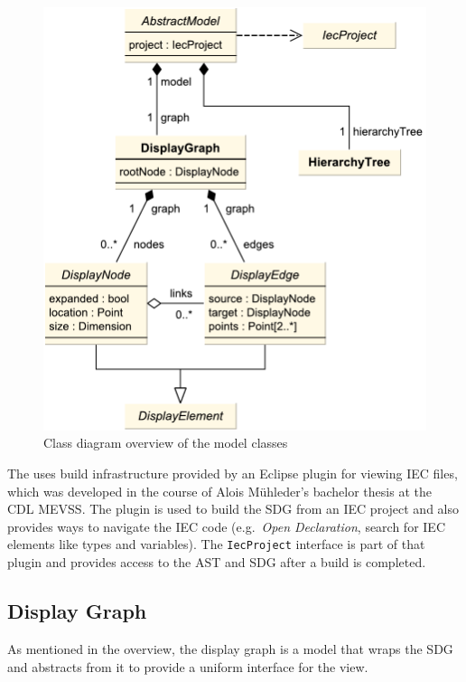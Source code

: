 \begin{figure}[htb]
  \centering
    \includegraphics[scale=0.65]{bilder/classes-model}
  \caption{Class diagram overview of the model classes}
  \label{fig:classes-model}
\end{figure}

The \SB uses build infrastructure provided by an Eclipse plugin for viewing IEC files, which was developed in the 
course of Alois Mühleder's bachelor thesis \cite{MuehlederBA} at the CDL MEVSS. The plugin is used to build the SDG 
from an IEC project and also provides ways to navigate the IEC code (e.g.\ \emph{Open Declaration}, search for IEC 
elements like types and variables). The \lstinline|IecProject| interface is part of that plugin and provides access to 
the AST and SDG after a build is completed.

\subsection{Display Graph}

As mentioned in the overview, the display graph is a model that wraps the SDG and abstracts from it to provide a 
uniform interface for the view.


